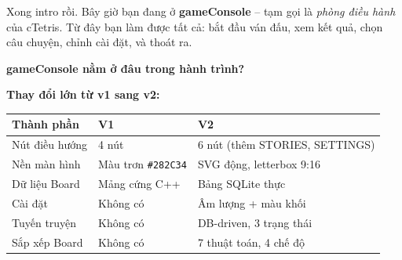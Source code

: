 \documentclass[12pt,a4paper]{article}
\begin{document}
Xong intro rồi. Bây giờ bạn đang ở \textbf{gameConsole} -- tạm gọi là
\textit{phòng điều hành} của cTetris. Từ đây bạn làm được tất cả: bắt
đầu ván đấu, xem kết quả, chọn câu chuyện, chỉnh cài đặt, và thoát ra.

\noindent\textbf{gameConsole nằm ở đâu trong hành trình?}

\vspace{8pt}
\begin{center}
\end{center}
\vspace{4pt}

\noindent\textbf{Thay đổi lớn từ v1 sang v2:}

\vspace{4pt}
\begin{tabularx}{\linewidth}{|l|l|X|}
    \hline
    \textbf{Thành phần} & \textbf{V1}                  & \textbf{V2} \\
    \hline
    Nút điều hướng      & 4 nút                        & 6 nút (thêm STORIES, SETTINGS) \\
    \hline
    Nền màn hình        & Màu trơn \texttt{\#282C34}   & SVG động, letterbox 9:16 \\
    \hline
    Dữ liệu Board       & Mảng cứng C++                & Bảng SQLite thực \\
    \hline
    Cài đặt             & Không có                     & Âm lượng + màu khối \\
    \hline
    Tuyến truyện        & Không có                     & DB-driven, 3 trạng thái \\
    \hline
    Sắp xếp Board       & Không có                     & 7 thuật toán, 4 chế độ \\
    \hline
\end{tabularx}
\end{document}
